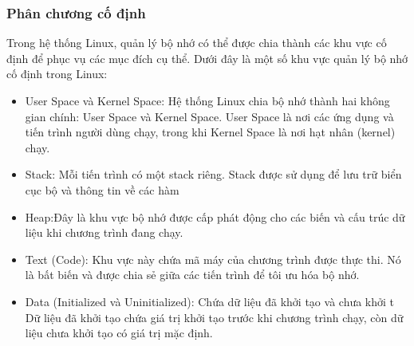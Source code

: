 \documentclass[12pt,a4paper]{article}
\begin{document}
\subsubsection{Phân chương cố định}
Trong hệ thống Linux, quản lý bộ nhớ có thể được chia thành các khu vực cố định để phục vụ các mục đích cụ thể. Dưới đây là một số khu vực quản lý bộ nhớ cố định trong Linux:
\begin{itemize}
	\item User Space và Kernel Space: Hệ thống Linux chia bộ nhớ thành hai không gian chính: User Space và Kernel Space. User Space là nơi các ứng dụng và tiến trình người dùng chạy, trong khi Kernel Space là nơi hạt nhân (kernel) chạy.
	\item Stack: Mỗi tiến trình có một stack riêng. Stack được sử dụng để lưu trữ biển cục bộ và thông tin về các hàm
	\item Heap:Đây là khu vực bộ nhớ được cấp phát động cho các biến và cấu trúc dữ liệu khi chương trình đang chạy.
	\item Text (Code):  Khu vực này chứa mã máy của chương trình được thực thi. Nó là bất biến và được chia sẻ giữa các tiến trình để tôi ưu hóa bộ nhớ.
	\item Data (Initialized và Uninitialized): Chứa dữ liệu đã khởi tạo và chưa khởi t Dữ liệu đã khởi tạo chứa giá trị khởi tạo trước khi chương trình chạy, còn dữ liệu chưa khởi tạo có giá trị mặc định.
\end{itemize}
\end{document}

